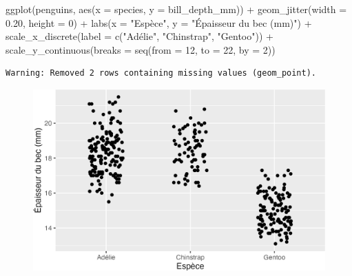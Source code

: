 \documentclass[
  letterpaper,
  DIV=11,
  numbers=noendperiod]{scrreprt}
\newenvironment{Shaded}{\begin{snugshade}}{\end{snugshade}}
\newcommand{\AttributeTok}[1]{\textcolor[rgb]{0.40,0.45,0.13}{#1}}
\newcommand{\DecValTok}[1]{\textcolor[rgb]{0.68,0.00,0.00}{#1}}
\newcommand{\FloatTok}[1]{\textcolor[rgb]{0.68,0.00,0.00}{#1}}
\newcommand{\FunctionTok}[1]{\textcolor[rgb]{0.28,0.35,0.67}{#1}}
\newcommand{\NormalTok}[1]{\textcolor[rgb]{0.00,0.23,0.31}{#1}}
\newcommand{\SpecialCharTok}[1]{\textcolor[rgb]{0.37,0.37,0.37}{#1}}
\newcommand{\StringTok}[1]{\textcolor[rgb]{0.13,0.47,0.30}{#1}}
\begin{document}
\begin{Shaded}
\begin{Highlighting}[]
\FunctionTok{ggplot}\NormalTok{(penguins, }\FunctionTok{aes}\NormalTok{(}\AttributeTok{x =}\NormalTok{ species, }\AttributeTok{y =}\NormalTok{ bill\_depth\_mm)) }\SpecialCharTok{+}
  \FunctionTok{geom\_jitter}\NormalTok{(}\AttributeTok{width =} \FloatTok{0.20}\NormalTok{, }\AttributeTok{height =} \DecValTok{0}\NormalTok{) }\SpecialCharTok{+}
  \FunctionTok{labs}\NormalTok{(}\AttributeTok{x =} \StringTok{"Espèce"}\NormalTok{, }\AttributeTok{y =} \StringTok{"Épaisseur du bec (mm)"}\NormalTok{) }\SpecialCharTok{+}
  \FunctionTok{scale\_x\_discrete}\NormalTok{(}\AttributeTok{label =} \FunctionTok{c}\NormalTok{(}\StringTok{"Adélie"}\NormalTok{, }\StringTok{"Chinstrap"}\NormalTok{, }\StringTok{"Gentoo"}\NormalTok{)) }\SpecialCharTok{+}
  \FunctionTok{scale\_y\_continuous}\NormalTok{(}\AttributeTok{breaks =} \FunctionTok{seq}\NormalTok{(}\AttributeTok{from =} \DecValTok{12}\NormalTok{, }\AttributeTok{to =} \DecValTok{22}\NormalTok{, }\AttributeTok{by =} \DecValTok{2}\NormalTok{))}
\end{Highlighting}
\end{Shaded}

\begin{verbatim}
Warning: Removed 2 rows containing missing values (geom_point).
\end{verbatim}

\begin{figure}[H]

{\centering \includegraphics{./03-visualization_files/figure-pdf/unnamed-chunk-106-1.png}

}

\end{figure}
\end{document}
